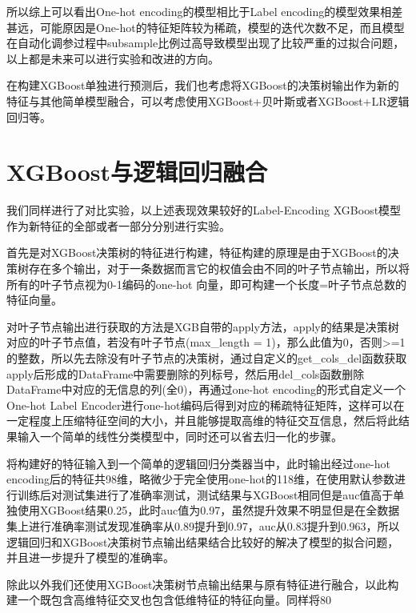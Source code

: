 所以综上可以看出One-hot encoding的模型相比于Label encoding的模型效果相差甚远，可能原因是One-hot的特征矩阵较为稀疏，模型的迭代次数不足，而且模型在自动化调参过程中subsample比例过高导致模型出现了比较严重的过拟合问题，以上都是未来可以进行实验和改进的方向。

在构建XGBoost单独进行预测后，我们也考虑将XGBoost的决策树输出作为新的特征与其他简单模型融合，可以考虑使用XGBoost+贝叶斯或者XGBoost+LR逻辑回归等。

\section{XGBoost与逻辑回归融合}

我们同样进行了对比实验，以上述表现效果较好的Label-Encoding XGBoost模型作为新特征的全部或者一部分分别进行实验。

首先是对XGBoost决策树的特征进行构建，特征构建的原理是由于XGBoost的决策树存在多个输出，对于一条数据而言它的权值会由不同的叶子节点输出，所以将所有的叶子节点视为0-1编码的one-hot 向量，即可构建一个长度=叶子节点总数的特征向量。

对叶子节点输出进行获取的方法是XGB自带的apply方法，apply的结果是决策树对应的叶子节点值，若没有叶子节点(max\_length = 1)，那么此值为0，否则>=1的整数，所以先去除没有叶子节点的决策树，通过自定义的get\_cols\_del函数获取apply后形成的DataFrame中需要删除的列标号，然后用del\_cols函数删除DataFrame中对应的无信息的列(全0)，再通过one-hot encoding的形式自定义一个One-hot Label Encoder进行one-hot编码后得到对应的稀疏特征矩阵，这样可以在一定程度上压缩特征空间的大小，并且能够提取高维的特征交互信息，然后将此结果输入一个简单的线性分类模型中，同时还可以省去归一化的步骤。

将构建好的特征输入到一个简单的逻辑回归分类器当中，此时输出经过one-hot encoding后的特征共98维，略微少于完全使用one-hot的118维，在使用默认参数进行训练后对测试集进行了准确率测试，测试结果与XGBoost相同但是auc值高于单独使用XGBoost结果0.25，此时auc值为0.97，虽然提升效果不明显但是在全数据集上进行准确率测试发现准确率从0.89提升到0.97，auc从0.83提升到0.963，所以逻辑回归和XGBoost决策树节点输出结果结合比较好的解决了模型的拟合问题，并且进一步提升了模型的准确率。

除此以外我们还使用XGBoost决策树节点输出结果与原有特征进行融合，以此构建一个既包含高维特征交叉也包含低维特征的特征向量。同样将80%

